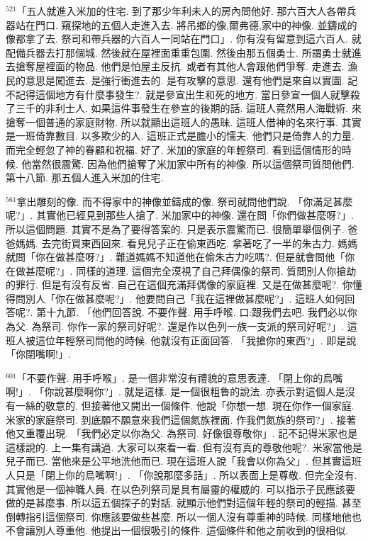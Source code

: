 \documentclass{book}
\begin{document}
$^{521}$「五人就進入米加的住宅.
到了那少年利未人的房內問他好.
那六百大人各帶兵器站在門口.
窺探地的五個人走進入去.
將吊鄉的像,爾弗德,家中的神像.
並鑄成的像都拿了去.
祭司和帶兵器的六百人一同站在門口」.
你有沒有留意到這六百人.
就配備兵器去打那個城.
然後就在屋裡面重重包圍.
然後由那五個勇士.
所謂勇士就進去搶奪屋裡面的物品.
他們是怕屋主反抗.
或者有其他人會跟他們爭奪.
走進去.
漁民的意思是闖進去.
是強行衝進去的.
是有攻擊的意思.
還有他們是來自以實圖.
記不記得這個地方有什麼事發生?.
就是參宣出生和死的地方.
當日參宣一個人就擊殺了三千的非利士人.
如果這件事發生在參宣的後期的話.
這班人竟然用人海戰術.
來搶奪一個普通的家庭財物.
所以就顯出這班人的愚昧.
這班人借神的名來行事.
其實是一班倚靠數目.
以多欺少的人.
這班正式是膽小的懦夫.
他們只是倚靠人的力量.
而完全輕忽了神的眷顧和祝福.
好了.
米加的家庭的年輕祭司.
看到這個情形的時候.
他當然很震驚.
因為他們搶奪了米加家中所有的神像.
所以這個祭司質問他們.
第十八節.
那五個人進入米加的住宅.

$^{561}$拿出雕刻的像.
而不得家中的神像並鑄成的像.
祭司就問他們說.
「你滿足甚麼呢?」.
其實他已經見到那些人搶了.
米加家中的神像.
還在問「你們做甚麼呀?」.
所以這個問題.
其實不是為了要得答案的.
只是表示震驚而已.
很簡單舉個例子.
爸爸媽媽.
去完街買東西回來.
看見兒子正在偷東西吃.
拿著吃了一半的朱古力.
媽媽就問「你在做甚麼呀?」.
難道媽媽不知道他在偷朱古力吃嗎?.
但是就會問他「你在做甚麼呢?」.
同樣的道理.
這個完全漠視了自己拜偶像的祭司.
質問別人你搶劫的罪行.
但是有沒有反省.
自己在這個充滿拜偶像的家庭裡.
又是在做甚麼呢?.
你懂得問別人「你在做甚麼呢?」.
他要問自己「我在這裡做甚麼呢?」.
這班人如何回答呢?.
第十九節.
「他們回答說.
不要作聲.
用手呼喉.
口:跟我們去吧.
我們必以你為父.
為祭司.
你作一家的祭司好呢?.
還是作以色列一族一支派的祭司好呢?」.
這班人被這位年輕祭司問他的時候.
他就沒有正面回答.
「我搶你的東西?」.
即是說「你閉嘴啊!」.

$^{601}$「不要作聲.
用手呼喉」.
是一個非常沒有禮貌的意思表達.
「閉上你的烏嘴啊!」.
「你說甚麼啊你?」.
就是這樣.
是一個很粗魯的說法.
亦表示對這個人是沒有一絲的敬意的.
但接著他又開出一個條件.
他說「你想一想.
現在你作一個家庭.
米家的家庭祭司.
到底願不願意來我們這個氮族裡面.
作我們氮族的祭司?」.
接著他又重覆出現.
「我們必定以你為父.
為祭司.
好像很尊敬你」.
記不記得米家也是這樣說的.
上一集有講過.
大家可以來看一看.
但有沒有真的尊敬他呢?.
米家當他是兒子而已.
當他來是公平地洗他而已.
現在這班人說「我會以你為父」.
但其實這班人只是「閉上你的烏嘴啊!」.
「你說那麼多話」.
所以表面上是尊敬.
但完全沒有.
其實他是一個神職人員.
在以色列祭司是具有屬靈的權威的.
可以指示子民應該要做的是甚麼事.
所以這五個探子的對話.
就顯示他們對這個年輕的祭司的輕描.
甚至倒轉指引這個祭司.
你應該要做些甚麼.
所以一個人沒有尊重神的時候.
同樣地他也不會讓別人尊重他.
他提出一個很吸引的條件.
這個條件和他之前收到的很相似.
\end{document}
